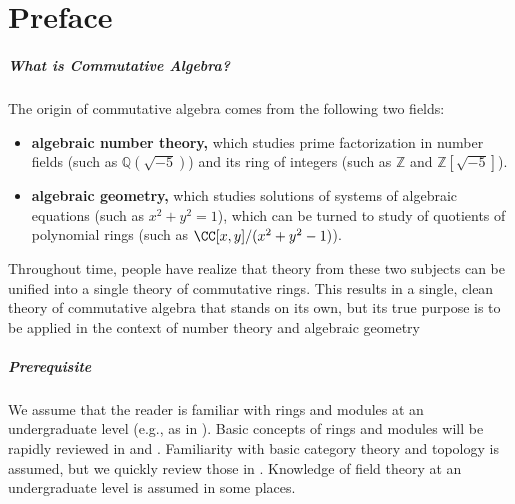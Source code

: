 \chapter*{Preface}
\paragraph{What is Commutative Algebra?}
The origin of commutative algebra comes from the following
two fields:
\begin{itemize}
\item \textbf{algebraic number theory,}
which studies prime factorization in number fields (such as $\mathbb Q(\sqrt{-5})$)
and its ring of integers (such as $\mathbb Z$ and $\mathbb Z[\sqrt{-5}]$).
\item \textbf{algebraic geometry,} which studies 
solutions of systems of algebraic equations 
(such as $x^2+y^2=1$), which can be turned 
to study of quotients of polynomial rings 
(such as $\CC[x,y]/(x^2+y^2-1)$).
\end{itemize}
Throughout time, people have realize that theory from these 
two subjects can be unified into a single theory of 
commutative rings. This results in a single, clean theory of commutative algebra that stands on its own, but its true purpose is to be applied in the context of number theory and algebraic geometry
\paragraph{Prerequisite}
We assume that the reader is familiar with rings and modules at an undergraduate level (e.g., as in \cite{artin}). 
Basic concepts of rings and modules will be rapidly reviewed 
in  and .
Familiarity with basic category theory and topology 
is assumed, but we quickly review those in .
Knowledge of field theory at an undergraduate level is assumed in some places. 

